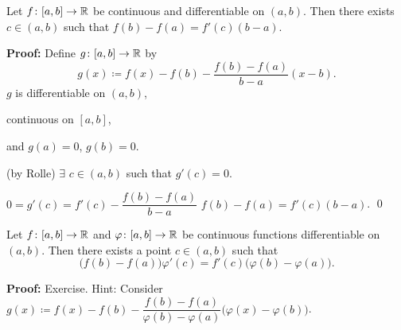 \documentclass[10pt,aspectratio=169]{beamer}
\begin{document}
\begin{frame}
\begin{theorem}
Let $f \colon [a,b] \to {\mathbb{R}}$ be continuous and
differentiable on $(a,b)$.  Then there exists $c \in (a,b)$
such that \quad
$f(b)-f(a) = f'(c)(b-a)$.
\end{theorem}

\pause
\textbf{Proof:}
Define 
$g \colon [a,b] \to {\mathbb{R}}$ by
\begin{equation*}
g(x) \coloneqq f(x)-f(b)-\frac{f(b)-f(a)}{b-a}(x-b) .
\end{equation*}
\pause
$g$ is differentiable on $(a,b)$,

\pause
continuous on $[a,b]$,

\pause
and $g(a) = 0$, $g(b) = 0$.

\pause
\medskip

\thus \quad (by Rolle) $\exists$
$c \in (a,b)$ such that $g'(c) = 0$.

\pause
\medskip

$0 = g'(c) = f'(c)-\dfrac{f(b)-f(a)}{b-a}$
\pause
\quad
{}
\quad
$f(b)-f(a) = f'(c)(b-a)$.
\qed

\end{frame}

\begin{frame}
\begin{theorem}
Let $f \colon [a,b] \to {\mathbb{R}}$ and $\varphi \colon [a,b] \to {\mathbb{R}}$ be continuous
functions
differentiable on $(a,b)$.  Then there exists a point $c \in (a,b)$
such that
\begin{equation*}
\bigl(f(b)-f(a)\bigr)\varphi'(c) = f'(c)\bigl(\varphi(b)-\varphi(a)\bigr) .
\end{equation*}
\end{theorem}

\pause
\textbf{Proof:} Exercise.
\pause
Hint: Consider
$g(x) \coloneqq
f(x)-f(b)-\dfrac{f(b)-f(a)}{\varphi(b)-\varphi(a)}\bigl(\varphi(x)-\varphi(b)\bigr)$.

\end{frame}
\end{document}

